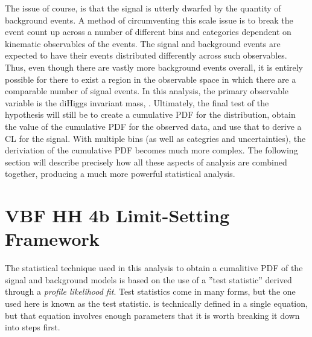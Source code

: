     The issue of course, is that the signal is utterly dwarfed by the quantity of background events.
    A method of circumventing this scale issue
        is to break the event count up across a number of different
        bins and categories dependent on kinematic observables of the events.
    The signal and background events are expected to have their events distributed differently across such observables.
    Thus, even though there are vastly more background events overall,
        it is entirely possible for there to exist a region in the observable space
        in which there are a comparable number of signal events.
    In this analysis, the primary observable variable is the diHiggs invariant mass, \mhh.
    Ultimately, the final test of the hypothesis will still be to create a cumulative PDF for the distribution,
        obtain the value of the cumulative PDF for the observed data, and use that to derive a CL for the signal.
    With multiple bins (as well as categries and uncertainties), the deriviation of the cumulative PDF becomes much more complex.
    The following section will describe precisely how all these aspects of analysis are combined together,
        producing a much more powerful statistical analysis.



\FloatBarrier
\section{VBF \to HH \to 4b Limit-Setting Framework}
    
    The statistical technique used in this analysis to obtain a cumalitive PDF of the signal and background models
        is based on the use of a ''test statistic'' derived through a \textit{profile likelihood fit}.
    Test statistics come in many forms, but the one used here is known as the \qtil test statistic.
    \qtil is technically defined in a single equation,
        but that equation involves enough parameters that it is worth breaking it down into steps first.

